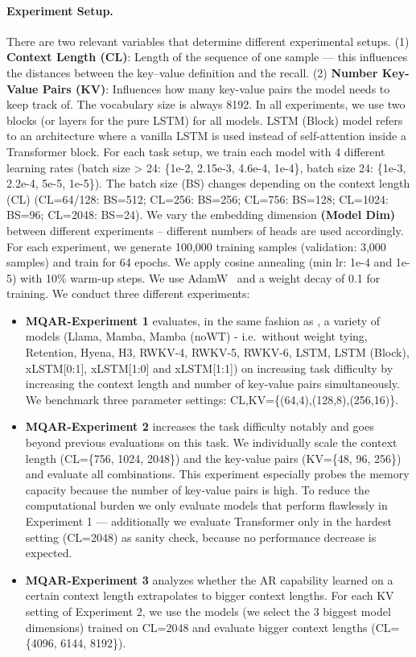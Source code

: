 \documentclass[dvipsnames]{article}
\begin{document}
\begin{appendix}
\paragraph{Experiment Setup.}
There are two relevant variables that determine
different experimental setups.
(1) \textbf{Context Length (CL)}: Length of the sequence of
one sample --- this influences the distances between the key--value
definition and the recall.
(2) \textbf{Number Key-Value Pairs (KV)}: Influences how many key-value
pairs the model needs to keep track of. The vocabulary size is always 8192.
In all experiments, we use two blocks (or layers for the pure LSTM) for all models.
LSTM (Block) model refers to an architecture
where a vanilla LSTM is used instead of self-attention inside a Transformer block.
For each task setup, we train each model with 4 different learning rates (batch size > 24: \{1e-2, 2.15e-3, 4.6e-4, 1e-4\}, batch size 24: \{1e-3, 2.2e-4, 5e-5, 1e-5\}). The batch size (BS) changes depending
on the context length (CL) (CL=64/128: BS=512;
CL=256: BS=256; CL=756: BS=128;
CL=1024: BS=96; CL=2048: BS=24).
We vary the embedding dimension \textbf{(Model Dim)} between different experiments
-- different numbers of heads are used accordingly.
For each experiment, we generate 100,000 training samples (validation: 3,000 samples)
and train for 64 epochs.
We apply cosine annealing (min lr: 1e-4 and 1e-5) with 10\% warm-up steps.
We use AdamW~\citep{Loshchilov:19} and a weight decay of 0.1 for training.
We conduct three different experiments:
\begin{itemize}
    \item\textbf{MQAR-Experiment 1} evaluates, in the same fashion as \citet{Arora:23arxiv}, a variety of models (Llama, Mamba, Mamba (noWT) - i.e.\ without weight tying, Retention, Hyena, H3, RWKV-4, RWKV-5, RWKV-6, LSTM, LSTM (Block), xLSTM[0:1], xLSTM[1:0] and xLSTM[1:1]) on increasing task difficulty by increasing the context length and number of key-value pairs simultaneously. We benchmark three parameter settings: CL,KV=\{(64,4),(128,8),(256,16)\}.
    \item\textbf{MQAR-Experiment 2} increases the task difficulty notably and goes beyond
    previous evaluations on this task.
    We individually scale the context length (CL=\{756, 1024, 2048\})
    and the key-value pairs (KV=\{48, 96, 256\}) and evaluate all combinations.
    This experiment especially probes the memory capacity because the number of key-value pairs is high.
    To reduce the computational burden we only evaluate models that perform flawlessly in Experiment 1 ---
    additionally we evaluate Transformer only in the hardest setting (CL=2048) as sanity check,
    because no performance decrease is expected.
    \item\textbf{MQAR-Experiment 3} analyzes whether the AR capability learned
    on a certain context length extrapolates to bigger context lengths.
    For each KV setting of Experiment 2, we use the models
    (we select the 3 biggest model dimensions) trained on CL=2048 and
    evaluate bigger context lengths (CL=\{4096, 6144, 8192\}).
\end{itemize}

\end{appendix}
\end{document}
